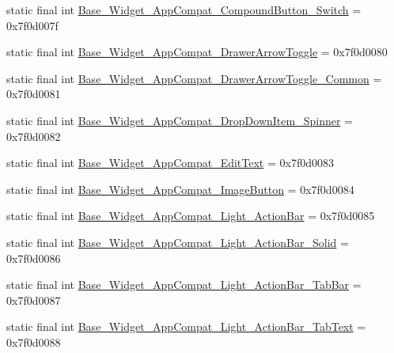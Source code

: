 \begin{DoxyCompactItemize}
static final int \mbox{\hyperlink{classandroid_1_1support_1_1v7_1_1appcompat_1_1_r_1_1style_add3a6916e7c77510f29c2c1cbe208285}{Base\+\_\+\+Widget\+\_\+\+App\+Compat\+\_\+\+Compound\+Button\+\_\+\+Switch}} = 0x7f0d007f
\item 
static final int \mbox{\hyperlink{classandroid_1_1support_1_1v7_1_1appcompat_1_1_r_1_1style_ac82ba537759e8daad392e766d595d175}{Base\+\_\+\+Widget\+\_\+\+App\+Compat\+\_\+\+Drawer\+Arrow\+Toggle}} = 0x7f0d0080
\item 
static final int \mbox{\hyperlink{classandroid_1_1support_1_1v7_1_1appcompat_1_1_r_1_1style_a31ca1ef9f55174e1ef5873ac1cfb023b}{Base\+\_\+\+Widget\+\_\+\+App\+Compat\+\_\+\+Drawer\+Arrow\+Toggle\+\_\+\+Common}} = 0x7f0d0081
\item 
static final int \mbox{\hyperlink{classandroid_1_1support_1_1v7_1_1appcompat_1_1_r_1_1style_a97a797d8997eff253a8e48da27e1e8a7}{Base\+\_\+\+Widget\+\_\+\+App\+Compat\+\_\+\+Drop\+Down\+Item\+\_\+\+Spinner}} = 0x7f0d0082
\item 
static final int \mbox{\hyperlink{classandroid_1_1support_1_1v7_1_1appcompat_1_1_r_1_1style_aded95edb41cbd1388bd486866f151cd3}{Base\+\_\+\+Widget\+\_\+\+App\+Compat\+\_\+\+Edit\+Text}} = 0x7f0d0083
\item 
static final int \mbox{\hyperlink{classandroid_1_1support_1_1v7_1_1appcompat_1_1_r_1_1style_a49ab8d062caa23ccaa5ffe51509381b2}{Base\+\_\+\+Widget\+\_\+\+App\+Compat\+\_\+\+Image\+Button}} = 0x7f0d0084
\item 
static final int \mbox{\hyperlink{classandroid_1_1support_1_1v7_1_1appcompat_1_1_r_1_1style_a312f41634ed7c5c1ed7363e934bbd4df}{Base\+\_\+\+Widget\+\_\+\+App\+Compat\+\_\+\+Light\+\_\+\+Action\+Bar}} = 0x7f0d0085
\item 
static final int \mbox{\hyperlink{classandroid_1_1support_1_1v7_1_1appcompat_1_1_r_1_1style_afe2f5b048e0567f29091d3f83d5fbf04}{Base\+\_\+\+Widget\+\_\+\+App\+Compat\+\_\+\+Light\+\_\+\+Action\+Bar\+\_\+\+Solid}} = 0x7f0d0086
\item 
static final int \mbox{\hyperlink{classandroid_1_1support_1_1v7_1_1appcompat_1_1_r_1_1style_a8d592bd0919bb0c93d0dfdcdf87b9364}{Base\+\_\+\+Widget\+\_\+\+App\+Compat\+\_\+\+Light\+\_\+\+Action\+Bar\+\_\+\+Tab\+Bar}} = 0x7f0d0087
\item 
static final int \mbox{\hyperlink{classandroid_1_1support_1_1v7_1_1appcompat_1_1_r_1_1style_aafd59f0c3cf68cf0449532c814c75409}{Base\+\_\+\+Widget\+\_\+\+App\+Compat\+\_\+\+Light\+\_\+\+Action\+Bar\+\_\+\+Tab\+Text}} = 0x7f0d0088
\item 

\end{DoxyCompactItemize}
